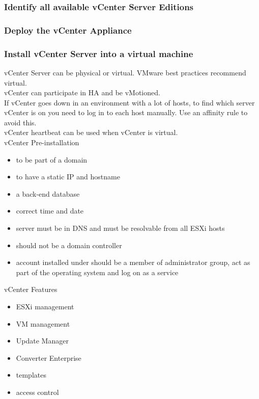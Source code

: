 \subsubsection{Identify all available vCenter Server Editions}

\subsubsection{Deploy the vCenter Appliance}

\subsubsection{Install vCenter Server into a virtual machine}

vCenter Server can be physical or virtual. VMware best practices recommend virtual.\\

vCenter can participate in HA and be vMotioned.\\

If vCenter goes down in an environment with a lot of hosts, to find which server vCenter
is on you need to log in to each host manually. Use an affinity rule to avoid this.\\

vCenter heartbeat can be used when vCenter is virtual.\\

vCenter Pre-installation

\begin{itemize}
\item to be part of a domain
\item to have a static IP and hostname
\item a back-end database
\item correct time and date
\item server must be in DNS and must be resolvable from all ESXi hosts
\item should not be a domain controller
\item account installed under should be a member of administrator group, act as part of the
operating system and log on as a service
\end{itemize}

vCenter Features

\begin{itemize}
\item ESXi management
\item VM management
\item Update Manager
\item Converter Enterprise
\item templates
\item access control
\end{itemize}

